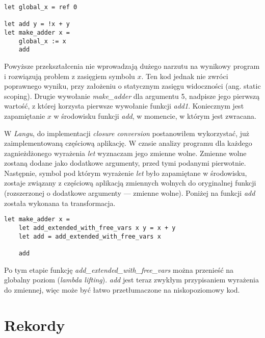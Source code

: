 \documentclass[declaration,shortabstract]{iithesis}
\begin{document}
\begin{lstlisting}[frame=single, caption={Wprowadzenie globalnej zmiennej.}]
let global_x = ref 0

let add y = !x + y 
let make_adder x = 
    global_x := x
    add 
\end{lstlisting}
Powyższe przekształcenia nie wprowadzają dużego narzutu na wynikowy program i rozwiązują 
problem z zasięgiem symbolu $x$. Ten kod jednak nie zwróci poprawnego wyniku, przy założeniu o statycznym zasięgu widoczności (ang. static scoping). Drugie 
wywołanie \textit{make\_adder} dla argumentu 5, nadpisze jego pierwszą wartość, z której korzysta pierwsze wywołanie funkcji \textit{add1}. Koniecznym jest zapamiętanie $x$ w środowisku funkcji 
\textit{add}, w momencie, w którym jest zwracana. 

W \textit{Langu}, do implementacji \textit{closure conversion} postanowiłem wykorzystać,
już zaimplementowaną częściową aplikację. W czasie analizy programu dla każdego 
zagnieżdżonego wyrażenia \textit{let} wyznaczam jego zmienne wolne. Zmienne wolne
zostaną dodane jako dodatkowe argumenty, przed tymi podanymi pierwotnie.
Następnie, symbol pod którym wyrażenie \textit{let} było zapamiętane w 
środowisku, zostaje związany z częściową aplikacją zmiennych wolnych 
do oryginalnej funkcji (rozszerzonej o dodatkowe argumenty --- zmienne wolne).
Poniżej na funkcji \textit{add} została wykonana ta transformacja.

\begin{lstlisting}[frame=single, caption={Wprowadzenie globalnej zmiennej.}]
let make_adder x = 
    let add_extended_with_free_vars x y = x + y
    let add = add_extended_with_free_vars x

    add
\end{lstlisting}

Po tym etapie funkcję \textit{add\_extended\_with\_free\_vars} można przenieść 
na globalny poziom (\textit{lambda lifting}). \textit{add} jest teraz zwykłym 
przypisaniem wyrażenia do zmiennej, więc może być łatwo przetłumaczone na 
niskopoziomowy kod.




\section{Rekordy}
\end{document}
